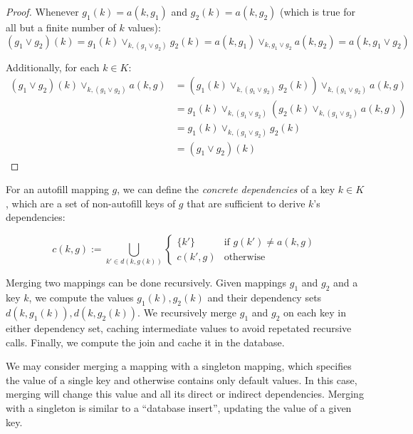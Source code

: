 \documentclass{article}
\begin{document}
        \begin{proof}

          Whenever $g_1(k) = a(k, g_1)$ and $g_2(k) = a(k, g_2)$ (which is true for all but a finite number of $k$ values):
           $$(g_1 \vee g_2)(k) = g_1(k) \vee_{k, (g_1 \vee g_2)} g_2(k) = a(k, g_1) \vee_{k, g_1 \vee g_2} a(k, g_2) = a(k, g_1 \vee g_2)$$

          Additionally, for each $k \in K$:
          \begin{align*}
            (g_1 \vee g_2)(k) \vee_{k, (g_1 \vee g_2)} a(k, g) 
            &= (g_1(k) \vee_{k, (g_1 \vee g_2)} g_2(k)) \vee_{k, (g_1 \vee g_2)} a(k, g) \\
            &= g_1(k) \vee_{k, (g_1 \vee g_2)} (g_2(k) \vee_{k, (g_1 \vee g_2)} a(k, g)) \\
            &= g_1(k) \vee_{k, (g_1 \vee g_2)} g_2(k) \\
            &= (g_1 \vee g_2)(k)
          \end{align*}
        \end{proof}

        For an autofill mapping $g$, we can define the \emph{concrete dependencies} of a key $k \in K$, which are a set of non-autofill keys of $g$ that are sufficient to derive $k$'s dependencies:

        $$c(k, g) := \bigcup_{k' \in d(k, g(k))} \begin{cases}
          \{k'\} & \text{if } g(k') \neq a(k, g) \\
          c(k', g) & \text{otherwise}
        \end{cases}  $$


        Merging two mappings can be done recursively. Given mappings $g_1$ and $g_2$ and a key $k$, we compute the values $g_1(k), g_2(k)$ and their dependency sets $d(k, g_1(k)), d(k, g_2(k))$. We recursively merge $g_1$ and $g_2$ on each key in either dependency set, caching intermediate values to avoid repetated recursive calls. Finally, we compute the join and cache it in the database.

        We may consider merging a mapping with a singleton mapping, which specifies the value of a single key and otherwise contains only default values. In this case, merging will change this value and all its direct or indirect dependencies. Merging with a singleton is similar to a ``database insert'', updating the value of a given key.
\end{document}
